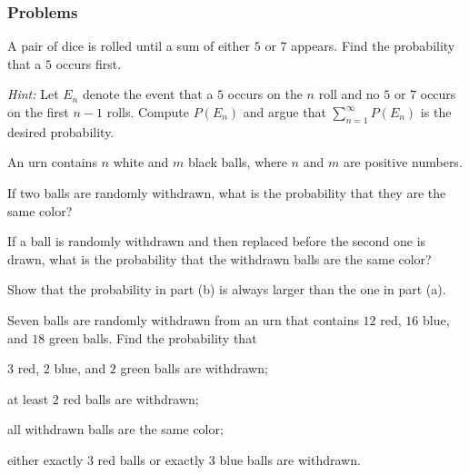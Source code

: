 \subsubsection{Problems}
\begin{problem}[Ross, \S 2, \# 25]
  A pair of dice is rolled until a sum of either \(5\) or \(7\)
  appears. Find the probability that a \(5\) occurs first.

  \noindent\emph{Hint:} Let \(E_n\)
  denote the event that a \(5\) occurs on the \(n\) roll and no
  \(5\) or \(7\) occurs on the first \(n-1\) rolls. Compute \(P(E_n)\) and
  argue that \(\sum_{n=1}^\infty P(E_n)\) is the desired probability.
\end{problem}
\begin{solution*}
\end{solution*}

\begin{problem}[Ross, \S 2, \# 29]
  An urn contains \(n\) white and \(m\) black balls, where \(n\) and \(m\)
  are positive numbers.
  \begin{alphlist}
  \item If two balls are randomly withdrawn, what is the probability that
    they are the same color?
  \item If a ball is randomly withdrawn and then replaced before the second
    one is drawn, what is the probability that the withdrawn balls are the
    same color?
  \item Show that the probability in part (b) is always larger than the one
    in part (a).
  \end{alphlist}
  \end{problem}
\begin{solution*}
\end{solution*}

\begin{problem}[Ross, \S 2, \# 35]
  Seven balls are randomly withdrawn from an urn that contains \(12\) red,
  \(16\) blue, and \(18\) green balls. Find the probability that
  \begin{alphlist}
  \item \(3\) red, \(2\) blue, and \(2\) green balls are withdrawn;
  \item at least \(2\) red balls are withdrawn;
  \item all withdrawn balls are the same color;
  \item either exactly \(3\) red balls or exactly \(3\) blue balls are
    withdrawn.
  \end{alphlist}
\end{problem}
\begin{solution*}
\end{solution*}

